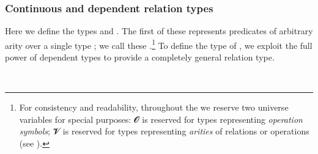 \subsubsection*{Continuous and dependent relation types} %

Here we define the types  and . The first of these represents predicates of arbitrary arity over a single type ; we call these .\footnote{%
For consistency and readability, throughout the \ualib we reserve two universe variables for special purposes: 𝓞 is reserved for types representing \emph{operation symbols}; 𝓥 is reserved for types representing \emph{arities} of
relations or operations (see ).}
To define the type  of , we exploit the full power of dependent types to provide a completely general relation type.
\ccpad
\begin{code}%
\>[0]\AgdaSpace{}%
\AgdaSymbol{:}\AgdaSpace{}%
\AgdaSpace{}%
\AgdaSpace{}%
\AgdaSpace{}%
\AgdaSpace{}%
\AgdaSpace{}%
\AgdaSpace{}%
\AgdaSymbol{(}\AgdaSpace{}%
\AgdaSymbol{:}\AgdaSpace{}%
\AgdaSymbol{)}\AgdaSpace{}%
\AgdaSpace{}%
\AgdaSpace{}%
\AgdaSpace{}%
\AgdaSpace{}%
\AgdaSpace{}%
\AgdaSpace{}%
\AgdaSpace{}%
\<%
\\
\>[0]\AgdaSpace{}%
\AgdaSpace{}%
\AgdaSpace{}%
\AgdaSpace{}%
\AgdaSymbol{=}\AgdaSpace{}%
\AgdaSymbol{(}\AgdaSpace{}%
\AgdaSpace{}%
\AgdaSymbol{)}\AgdaSpace{}%
\AgdaSpace{}%
\AgdaSpace{}%
\<%
\end{code}
\scpad
